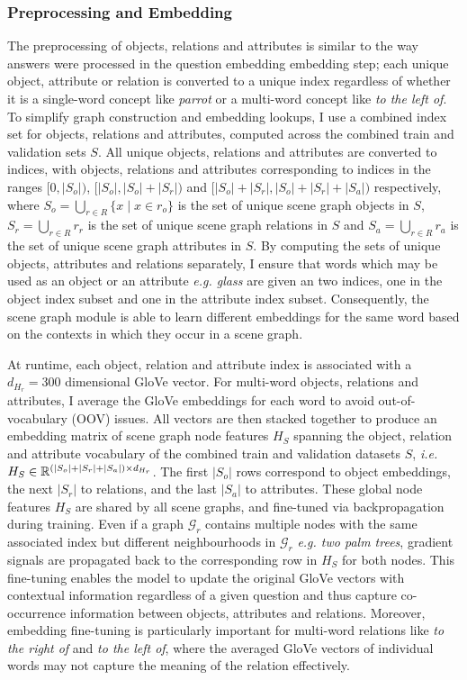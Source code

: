 \subsubsection{Preprocessing and Embedding}
The preprocessing of objects, relations and attributes is similar to the way answers were processed in the question embedding embedding step; each unique object, attribute or relation is converted to a unique index regardless of whether it is a single-word concept like \textit{parrot} or a multi-word concept like \textit{to the left of}. To simplify graph construction and embedding lookups, I use a combined index set for objects, relations and attributes, computed across the combined train and validation sets \(S\). All unique objects, relations and attributes are converted to indices, with objects, relations and attributes corresponding to indices in the ranges \([0, |S_o|)\), \([|S_o|, |S_o| + |S_r|)\) and  \([|S_o| + |S_r|, |S_o| + |S_r| + |S_a|)\) respectively, where \(S_o = \bigcup_{r \in R} \{x \mid x \in r_o\}\) is the set of unique scene graph objects in \(S\), \(S_r = \bigcup_{r \in R} r_r\) is the set of unique scene graph relations in \(S\) and \(S_a = \bigcup_{r \in R} r_a\) is the set of unique scene graph  attributes in \(S\). By computing the sets of unique objects, attributes and relations separately, I ensure that words which may be used as an object or an attribute \textit{e.g. glass} are given an two indices, one in the object index subset and one in the attribute index subset. Consequently, the scene graph module is able to learn different embeddings for the same word based on the contexts in which they occur in a scene graph.

At runtime, each object, relation and attribute index is associated with a \(d_{H_r} = 300\) dimensional GloVe vector. For multi-word objects, relations and attributes, I average the GloVe embeddings for each word to avoid out-of-vocabulary (OOV) issues. All vectors are then stacked together to produce an embedding matrix of scene graph node features \(H_S\) spanning the object, relation and attribute vocabulary of the combined train and validation datasets \(S\), \textit{i.e.} \(H_S \in \mathbb{R}^{(|S_o| + |S_r| + |S_a|) \times d_{H_r}}\). The first \(|S_o|\) rows correspond to object embeddings, the next \(|S_r|\) to relations, and the last \(|S_a|\) to attributes. These global node features \(H_S\) are shared by all scene graphs, and fine-tuned via backpropagation  during training. Even if a graph \(\mathcal{G}_r\) contains multiple nodes with the same associated index but different neighbourhoods in \(\mathcal{G}_r\) \textit{e.g. two palm trees}, gradient signals are propagated back to the corresponding row in \(H_S\) for both nodes. This fine-tuning enables the model to update the original GloVe vectors with contextual information regardless of a given question and thus capture co-occurrence information between objects, attributes and relations. Moreover, embedding fine-tuning is particularly important for multi-word relations like \textit{to the right of} and \textit{to the left of}, where the averaged GloVe vectors of individual words may not capture the meaning of the relation effectively.

